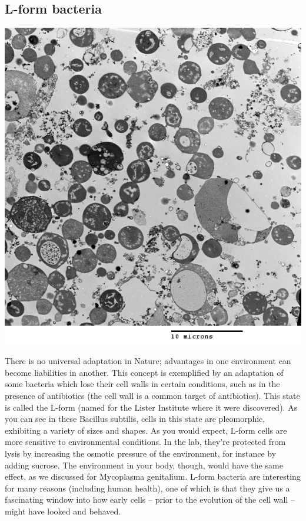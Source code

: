 \documentclass[]{tufte-book}
\begin{document}
\hypertarget{L-form_bacteria}{\subsection{L-form
bacteria}\label{L-form_bacteria}}

\includegraphics{img/02_schematic/2_2_1_L_form_bacteria}

There is no universal adaptation in Nature; advantages in one
environment can become liabilities in another. This concept is
exemplified by an adaptation of some bacteria which lose their cell
walls in certain conditions, such as in the presence of antibiotics (the
cell wall is a common target of antibiotics). This state is called the
L-form (named for the Lister Institute where it were discovered). As you
can see in these Bacillus subtilis, cells in this state are pleomorphic,
exhibiting a variety of sizes and shapes. As you would expect, L-form
cells are more sensitive to environmental conditions. In the lab,
they're protected from lysis by increasing the osmotic pressure of the
environment, for instance by adding sucrose. The environment in your
body, though, would have the same effect, as we discussed for Mycoplasma
genitalium. L-form bacteria are interesting for many reasons (including
human health), one of which is that they give us a fascinating window
into how early cells -- prior to the evolution of the cell wall -- might
have looked and behaved.
\end{document}
